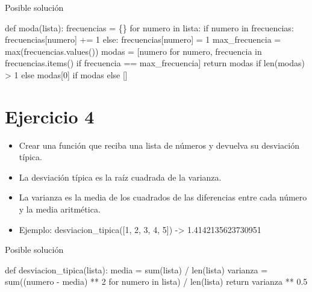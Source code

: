 \documentclass[
  a4paper,
  DIV=11,
  numbers=noendperiod,
  onepage,
  openany]{scrreprt}
\newenvironment{Shaded}{\begin{snugshade}}{\end{snugshade}}
\newcommand{\BuiltInTok}[1]{\textcolor[rgb]{0.00,0.23,0.31}{#1}}
\newcommand{\ControlFlowTok}[1]{\textcolor[rgb]{0.00,0.23,0.31}{#1}}
\newcommand{\DecValTok}[1]{\textcolor[rgb]{0.68,0.00,0.00}{#1}}
\newcommand{\FloatTok}[1]{\textcolor[rgb]{0.68,0.00,0.00}{#1}}
\newcommand{\KeywordTok}[1]{\textcolor[rgb]{0.00,0.23,0.31}{#1}}
\newcommand{\NormalTok}[1]{\textcolor[rgb]{0.00,0.23,0.31}{#1}}
\newcommand{\OperatorTok}[1]{\textcolor[rgb]{0.37,0.37,0.37}{#1}}
\providecommand{\tightlist}{%
  \setlength{\itemsep}{0pt}\setlength{\parskip}{0pt}}\usepackage{longtable,booktabs,array}
\begin{document}
Posible solución

\begin{Shaded}
\begin{Highlighting}[]
\KeywordTok{def}\NormalTok{ moda(lista):}
\NormalTok{    frecuencias }\OperatorTok{=}\NormalTok{ \{\}}
    \ControlFlowTok{for}\NormalTok{ numero }\KeywordTok{in}\NormalTok{ lista:}
        \ControlFlowTok{if}\NormalTok{ numero }\KeywordTok{in}\NormalTok{ frecuencias:}
\NormalTok{            frecuencias[numero] }\OperatorTok{+=} \DecValTok{1}
        \ControlFlowTok{else}\NormalTok{:}
\NormalTok{            frecuencias[numero] }\OperatorTok{=} \DecValTok{1}
\NormalTok{    max\_frecuencia }\OperatorTok{=} \BuiltInTok{max}\NormalTok{(frecuencias.values())}
\NormalTok{    modas }\OperatorTok{=}\NormalTok{ [numero }\ControlFlowTok{for}\NormalTok{ numero, frecuencia }\KeywordTok{in}\NormalTok{ frecuencias.items() }\ControlFlowTok{if}\NormalTok{ frecuencia }\OperatorTok{==}\NormalTok{ max\_frecuencia]}
    \ControlFlowTok{return}\NormalTok{ modas }\ControlFlowTok{if} \BuiltInTok{len}\NormalTok{(modas) }\OperatorTok{\textgreater{}} \DecValTok{1} \ControlFlowTok{else}\NormalTok{ modas[}\DecValTok{0}\NormalTok{] }\ControlFlowTok{if}\NormalTok{ modas }\ControlFlowTok{else}\NormalTok{ []}
\end{Highlighting}
\end{Shaded}

\section{Ejercicio 4}\label{ejercicio-4-2}

\begin{itemize}
\tightlist
\item
  Crear una función que reciba una lista de números y devuelva su
  desviación típica.
\item
  La desviación típica es la raíz cuadrada de la varianza.
\item
  La varianza es la media de los cuadrados de las diferencias entre cada
  número y la media aritmética.
\item
  Ejemplo: desviacion\_tipica({[}1, 2, 3, 4, 5{]}) -\textgreater{}
  1.4142135623730951
\end{itemize}

Posible solución

\begin{Shaded}
\begin{Highlighting}[]
\KeywordTok{def}\NormalTok{ desviacion\_tipica(lista):}
\NormalTok{    media }\OperatorTok{=} \BuiltInTok{sum}\NormalTok{(lista) }\OperatorTok{/} \BuiltInTok{len}\NormalTok{(lista)}
\NormalTok{    varianza }\OperatorTok{=} \BuiltInTok{sum}\NormalTok{((numero }\OperatorTok{{-}}\NormalTok{ media) }\OperatorTok{**} \DecValTok{2} \ControlFlowTok{for}\NormalTok{ numero }\KeywordTok{in}\NormalTok{ lista) }\OperatorTok{/} \BuiltInTok{len}\NormalTok{(lista)}
    \ControlFlowTok{return}\NormalTok{ varianza }\OperatorTok{**} \FloatTok{0.5}
\end{Highlighting}
\end{Shaded}
\end{document}
